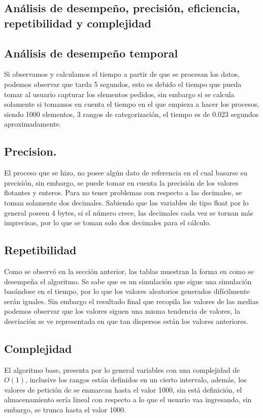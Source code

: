 \documentclass{article}
\begin{document}
\subsection{Análisis de desempeño, precisión, eficiencia, repetibilidad y complejidad}
\subsection*{Análisis de desempeño temporal}
Si observamos y calculamos el tiempo a partir de que se procesan los datos, podemos observar que tarda 5 segundos, esto es debido el tiempo que pueda tomar al usuario capturar los elementos pedidos, sin embargo si se calcula solamente si tomamos en cuenta el tiempo en el que empieza a hacer los procesos, siendo 1000 elementos, 3 rangos de categorización, el tiempo es de 0.023 segundos aproximadamente.
\subsection*{Precision.}
El proceso que se hizo, no posee algún dato de referencia en el cual basarse su precisión, sin embargo, se puede tomar en cuenta la precisión de los valores flotantes y enteros. Para no tener problemas con respecto a las decimales, se toman solamente dos decimales. Sabiendo que las variables de tipo float por lo general poseen 4 bytes, si el número crece, las decimales cada vez se tornan más imprecisas, por lo que se toman solo dos decimales para el cálculo.
\subsection*{Repetibilidad}
Como se observó en la sección anterior, las tablas muestran la forma en como se desempeña el algoritmo. Se sabe que es un simulación que sigue una simulación basándose en el tiempo, por lo que los valores aleatorios generados difícilmente serán iguales. Sin embargo el resultado final que recopila los valores de las medias podemos observar que los valores siguen una misma tendencia de valores, la desviación se ve representada en que tan dispersos están los valores anteriores.
\subsection*{Complejidad}
El algoritmo base, presenta por lo general variables con una complejidad de $O(1)$, inclusive los rangos están definidos en un cierto intervalo, además, los valores de petición de se enmarcan hasta el valor 1000, sin está definición, el almacenamiento sería lineal con respecto a lo que el usuario vaa ingresando, sin embargo, se trunca hasta el valor 1000.
\end{document}
